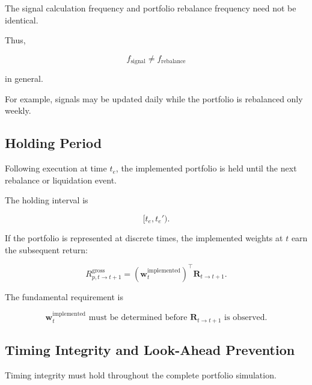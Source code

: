 \documentclass[11pt,a4paper]{article}
\begin{document}
The signal calculation frequency and portfolio rebalance frequency need not be
identical.

Thus,

\begin{equation}
\boxed{
f_{\mathrm{signal}}
\neq
f_{\mathrm{rebalance}}
}
\end{equation}

in general.

For example, signals may be updated daily while the portfolio is rebalanced only
weekly.


\subsection{Holding Period}

Following execution at time $t_e$, the implemented portfolio is held until the
next rebalance or liquidation event.

The holding interval is

\begin{equation}
\boxed{
[t_e,t_e').
}
\end{equation}

If the portfolio is represented at discrete times, the implemented weights at
$t$ earn the subsequent return:

\begin{equation}
\boxed{
R_{p,t\rightarrow t+1}^{\mathrm{gross}}
=
\left(
\mathbf{w}_t^{\mathrm{implemented}}
\right)^\top
\mathbf{R}_{t\rightarrow t+1}.
}
\end{equation}

The fundamental requirement is

\begin{equation}
\boxed{
\mathbf{w}_t^{\mathrm{implemented}}
\text{ must be determined before }
\mathbf{R}_{t\rightarrow t+1}
\text{ is observed}.
}
\end{equation}


\subsection{Timing Integrity and Look-Ahead Prevention}

Timing integrity must hold throughout the complete portfolio simulation.
\end{document}
